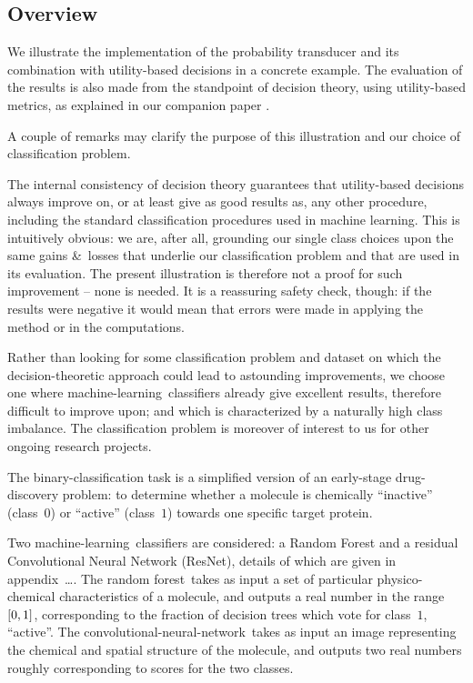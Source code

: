 \documentclass[\ifafour a4paper,12pt,\else a5paper,10pt,\fi%
onecolumn,oneside,article,%
british%
]{memoir}
\theoremstyle{remark}
\theoremstyle{innote}
\newcommand*{\amp}{\&}
\newcommand*{\pencil}{{\fontencoding{U}\fontfamily{fontawesometwo}\selectfont\symbol{210}}}
\newcommand{\mynotep}[1]{{\footnotesize\color{notecolour}\pencil\ #1}}
\DeclarePairedDelimiter\clcl{[}{]}
\renewcommand*{\|}[1][]{\nonscript\:#1\vert\nonscript\:\mathopen{}}
\newcommand*{\ml}{machine-learning}
\newcommand*{\RF}{random forest}
\newcommand*{\cnn}{convolutional-neural-network}
\begin{document}
\subsection{Overview}
\label{sec:demo_overview}

We illustrate the implementation of the probability transducer and its combination with utility-based decisions in a concrete example. The evaluation of the results is also made from the standpoint of decision theory, using utility-based metrics, as explained in our companion paper \autocites{dyrlandetal2022}.

A couple of remarks may clarify the purpose of this illustration and our choice of classification problem.

The internal consistency of decision theory guarantees that utility-based decisions always improve on, or at least give as good results as, any other procedure, including the standard classification procedures used in machine learning. This is intuitively obvious: we are, after all, grounding our single class choices upon the same gains \amp\ losses that underlie our classification problem and that are used in its evaluation. The present illustration is therefore not a proof for such improvement -- none is needed. It is a reassuring safety check, though: if the results were negative it would mean that errors were made in applying the method or in the computations.

Rather than looking for some classification problem and dataset on which the decision-theoretic approach could lead to astounding improvements, we choose one where \ml\ classifiers already give excellent results, therefore difficult to improve upon; and which is characterized by a naturally high class imbalance. The classification problem is moreover of interest to us for other ongoing research projects.

The binary-classification task is a simplified version of an early-stage drug-discovery problem: to determine whether a molecule is chemically \enquote{inactive} (class~$0$) or \enquote{active} (class~$1$) towards one specific target protein.

Two \ml\ classifiers are considered: a Random Forest and a residual Convolutional Neural Network (ResNet), details of which are given in appendix\mynotep{\ldots}. The \RF\ takes as input a set of particular physico-chemical characteristics of a molecule, and outputs a real number in the range $\clcl{0,1}$, corresponding to the fraction of decision trees which vote for class~$1$, \enquote{active}. The \cnn\ takes as input an image representing the chemical and spatial structure of the molecule, and outputs two real numbers roughly corresponding to scores for the two classes.
\end{document}
